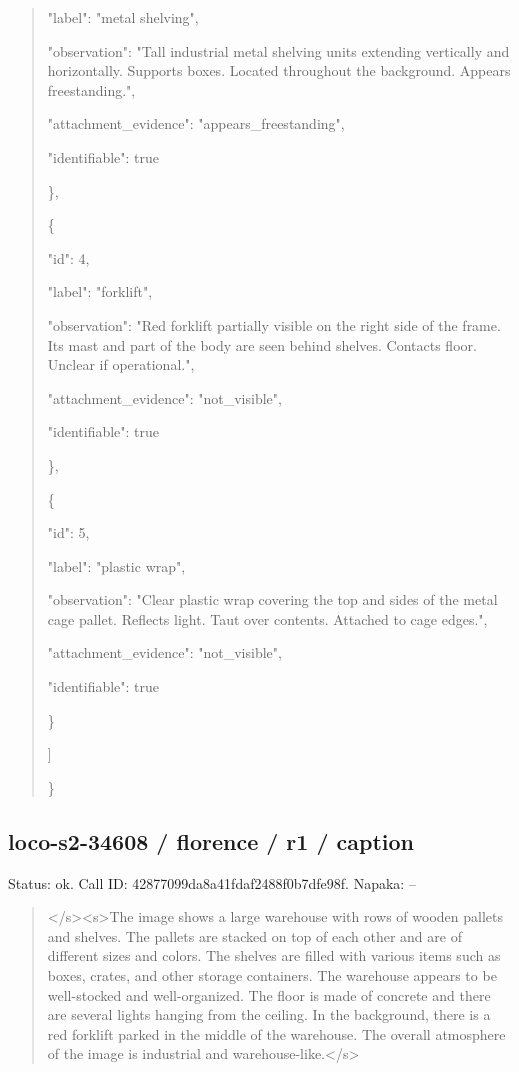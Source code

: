 \documentclass[10pt,a4paper]{article}
\begin{document}
\begin{quote}
      "label":\allowbreak{} "metal shelving",\allowbreak{}\par
      "observation":\allowbreak{} "Tall industrial metal shelving units extending vertically and horizontally. Supports boxes. Located throughout the background. Appears freestanding.",\allowbreak{}\par
      "attachment\_evidence":\allowbreak{} "appears\_freestanding",\allowbreak{}\par
      "identifiable":\allowbreak{} true\par
    \},\allowbreak{}\par
    \{\par
      "id":\allowbreak{} 4,\allowbreak{}\par
      "label":\allowbreak{} "forklift",\allowbreak{}\par
      "observation":\allowbreak{} "Red forklift partially visible on the right side of the frame. Its mast and part of the body are seen behind shelves. Contacts floor. Unclear if operational.",\allowbreak{}\par
      "attachment\_evidence":\allowbreak{} "not\_visible",\allowbreak{}\par
      "identifiable":\allowbreak{} true\par
    \},\allowbreak{}\par
    \{\par
      "id":\allowbreak{} 5,\allowbreak{}\par
      "label":\allowbreak{} "plastic wrap",\allowbreak{}\par
      "observation":\allowbreak{} "Clear plastic wrap covering the top and sides of the metal cage pallet. Reflects light. Taut over contents. Attached to cage edges.",\allowbreak{}\par
      "attachment\_evidence":\allowbreak{} "not\_visible",\allowbreak{}\par
      "identifiable":\allowbreak{} true\par
    \}\par
  ]\par
\}
\end{quote}
\subsection*{loco-s2-34608 / florence / r1 / caption}
Status: ok. Call ID: 42877099da8a41fdaf2488f0b7dfe98f. Napaka: --
\begin{quote}\footnotesize
</s>\allowbreak{}<s>\allowbreak{}The image shows a large warehouse with rows of wooden pallets and shelves. The pallets are stacked on top of each other and are of different sizes and colors. The shelves are filled with various items such as boxes,\allowbreak{} crates,\allowbreak{} and other storage containers. The warehouse appears to be well-stocked and well-organized. The floor is made of concrete and there are several lights hanging from the ceiling. In the background,\allowbreak{} there is a red forklift parked in the middle of the warehouse. The overall atmosphere of the image is industrial and warehouse-like.</s>\allowbreak{}
\end{quote}
\end{document}
